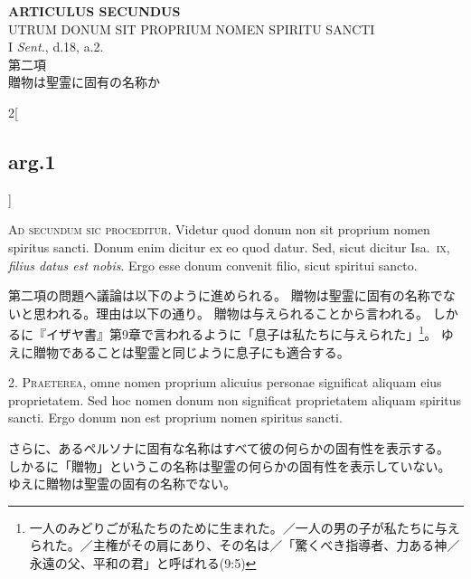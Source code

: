 \documentclass[paper=a4paper,fontsize=10pt,jafontsize=9pt,titlepage]{jlreq}
\begin{document}
\newpage
{}
\begin{center}
 {\Large {\bfseries ARTICULUS SECUNDUS}}\\
 {\large UTRUM DONUM SIT PROPRIUM NOMEN SPIRITU SANCTI}\\
 {\footnotesize I \textit{Sent.}, d.18, a.2.}\\
 {\Large 第二項\\贈物は聖霊に固有の名称か}
\end{center}


{}
\setcounter{section}{2}
\setcounter{subsection}{0}

\begin{paracol}{2}[\subsection{arg.1}]

\textsc{Ad secundum sic proceditur.} Videtur quod donum non sit proprium nomen
spiritus sancti. Donum enim dicitur ex eo quod datur. Sed, sicut dicitur
Isa.~\textsc{ix}, \textit{filius datus est nobis}. Ergo esse donum convenit
filio, sicut spiritui sancto.

\switchcolumn

第二項の問題へ議論は以下のように進められる。
贈物は聖霊に固有の名称でないと思われる。理由は以下の通り。
贈物は与えられることから言われる。
しかるに『イザヤ書』第9章で言われるように「息子は私たちに与えられた」\footnote{一人のみどりごが私たちのために生まれた。／一人の男の子が私たちに与えられた。／主権がその肩にあり、その名は／「驚くべき指導者、力ある神／永遠の父、平和の君」と呼ばれる(9:5)}。
ゆえに贈物であることは聖霊と同じように息子にも適合する。


2. \textsc{Praeterea}, omne nomen proprium alicuius personae significat aliquam
eius proprietatem. Sed hoc nomen donum non significat proprietatem aliquam
spiritus sancti. Ergo donum non est proprium nomen spiritus sancti.

\switchcolumn

さらに、あるペルソナに固有な名称はすべて彼の何らかの固有性を表示する。
しかるに「贈物」というこの名称は聖霊の何らかの固有性を表示していない。
ゆえに贈物は聖霊の固有の名称でない。


\end{paracol}
\end{document}

